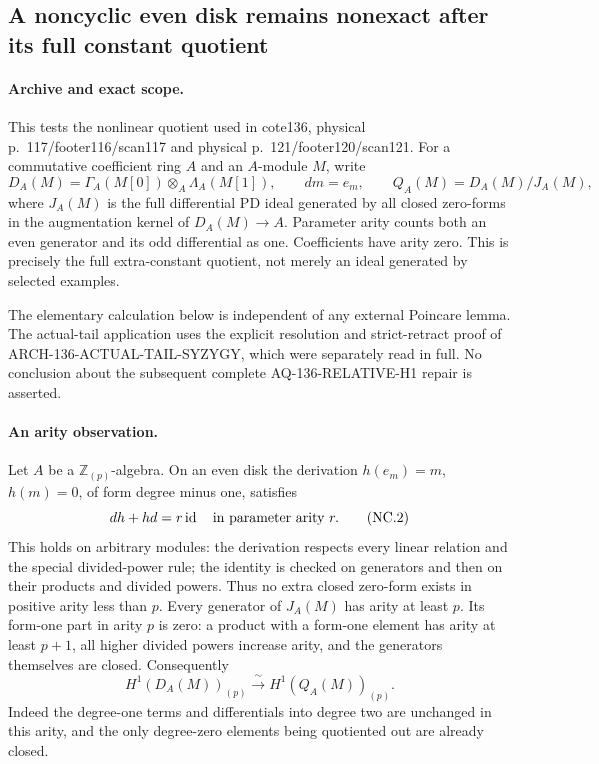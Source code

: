 \subsection{A noncyclic even disk remains nonexact after its full constant quotient}
\label{arch136:noncyclic-constant-quotient}

\paragraph{Archive and exact scope.}
This tests the nonlinear quotient used in cote136, physical
p.~117/footer116/scan117 and physical p.~121/footer120/scan121.
For a commutative coefficient ring \(A\) and an \(A\)-module \(M\),
write
\[
 D_A(M)=\Gamma_A(M[0])\otimes_A\Lambda_A(M[1]),
 \qquad dm=e_m,
 \qquad
 Q_A(M)=D_A(M)/J_A(M),                                  \tag{NC.1}
\]
where \(J_A(M)\) is the full differential PD ideal generated by
all closed zero-forms in the augmentation kernel of
\(D_A(M)\to A\).  Parameter arity counts both an even generator
and its odd differential as one.  Coefficients have arity zero.
This is precisely the full extra-constant quotient, not merely
an ideal generated by selected examples.

The elementary calculation below is independent of any external
Poincare lemma.  The actual-tail application uses the explicit
resolution and strict-retract proof of
ARCH-136-ACTUAL-TAIL-SYZYGY, which were separately read in full.
No conclusion about the subsequent complete
AQ-136-RELATIVE-H1 repair is asserted.

\paragraph{An arity observation.}
Let \(A\) be a \(\mathbb Z_{(p)}\)-algebra.  On an even disk
the derivation \(h(e_m)=m\), \(h(m)=0\), of form degree minus one,
satisfies
\[
                       dh+hd=r\operatorname{id}
                   \quad\hbox{in parameter arity }r.   \tag{NC.2}
\]
This holds on arbitrary modules: the derivation respects every
linear relation and the special divided-power rule; the identity
is checked on generators and then on their products and divided
powers.  Thus no extra closed zero-form exists in positive arity
less than \(p\).  Every generator of \(J_A(M)\) has arity at least
\(p\).  Its form-one part in arity \(p\) is zero: a product with a
form-one element has arity at least \(p+1\), all higher divided
powers increase arity, and the generators themselves are closed.
Consequently
\[
                   H^1(D_A(M))_{(p)}
                    \xrightarrow{\ \sim\ }
                   H^1(Q_A(M))_{(p)}.                 \tag{NC.3}
\]
Indeed the degree-one terms and differentials into degree two
are unchanged in this arity, and the only degree-zero elements
being quotiented out are already closed.

